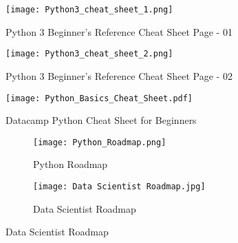 \documentclass{article}
\begin{document}
\newpage
\begin{figure}
    \centering
    \texttt{[image: Python3\_cheat\_sheet\_1.png]}
    \caption{Python 3 Beginner's Reference Cheat Sheet Page - 01}
    \label{fig:01}
\end{figure}

\begin{figure}
    \centering
    \texttt{[image: Python3\_cheat\_sheet\_2.png]}
    \caption{Python 3 Beginner's Reference Cheat Sheet Page - 02}
    \label{fig:02}
\end{figure}

\begin{figure}
    \centering
    \texttt{[image: Python\_Basics\_Cheat\_Sheet.pdf]}
    \caption{Datacamp Python Cheat Sheet for Beginners}
    \label{fig:03}
\end{figure}

\newpage
\begin{figure}[h]
    \centering
    \captionsetup{justification=centering}
    \caption{Python \& Data Science}
    
    \begin{subfigure}{0.4\textwidth}
        \centering
        \texttt{[image: Python\_Roadmap.png]}
        \caption{Python Roadmap}
    \end{subfigure}
    \begin{subfigure}{0.4\textwidth}
        \centering
        \texttt{[image: Data Scientist Roadmap.jpg]}
        \caption{Data Scientist Roadmap}
    \end{subfigure}
\end{figure}
\end{document}
